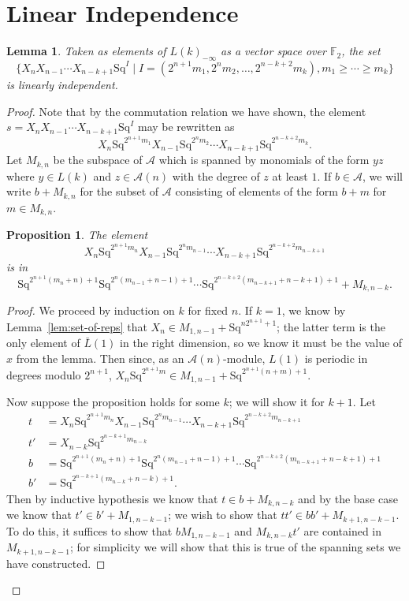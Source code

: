 \documentclass{article}
\newcommand{\A}{\mathcal{A}}
\newcommand{\F}{\mathbb{F}}
\newcommand{\Sq}{\mathrm{Sq}}
\renewcommand{\L}{\bar{L}}
\newcommand{\Lkm}[1][k]{L{(#1)}_{-\infty}}
\newtheorem{prop}{Proposition}
\newtheorem{lem}{Lemma}
\begin{document}
\section{Linear Independence}

\begin{lem}\label{lem:li-vs}
  Taken as elements of $\Lkm$ as a vector space over $\F_2$, the set
  \[\{X_nX_{n-1}\cdots X_{n-k+1}\Sq^I\mid I=(2^{n+1}m_1,2^nm_2,\ldots,2^{n-k+2}m_k), m_1\geq\cdots\geq m_k\}\]
  is linearly independent.
\end{lem}
\begin{proof}
  Note that by the commutation relation we have shown, the element $s=X_nX_{n-1}\cdots X_{n-k+1}\Sq^I$ may be rewritten as
  \[X_n\Sq^{2^{n+1}m_1}X_{n-1}\Sq^{2^nm_2}\cdots X_{n-k+1}\Sq^{2^{n-k+2}m_k}.\]
  Let $M_{k,n}$ be the subspace of $\A$ which is spanned by monomials of the form $yz$ where $y\in L(k)$ and $z\in \A(n)$ with the degree of $z$ at least $1$.  If $b\in \A$, we will write $b+M_{k,n}$ for the subset of $\A$ consisting of elements of the form $b+m$ for $m\in M_{k,n}$.

  \begin{prop}\label{prop:m-thing}
    The element
    \[X_n\Sq^{2^{n+1}m_n}X_{n-1}\Sq^{2^nm_{n-1}}\cdots X_{n-k+1}\Sq^{2^{n-k+2}m_{n-k+1}}\]
    is in
    \[\Sq^{2^{n+1}(m_n+n)+1}\Sq^{2^n(m_{n-1}+n-1)+1}\cdots\Sq^{2^{n-k+2}(m_{n-k+1}+n-k+1)+1} + M_{k,n-k}.\]
  \end{prop}
  \begin{proof}

    We proceed by induction on $k$ for fixed $n$.  If $k=1$, we know by Lemma~\ref{lem:set-of-reps} that $X_n\in M_{1,n-1}+\Sq^{n2^{n+1}+1}$; the latter term is the only element of $\L(1)$ in the right dimension, so we know it must be the value of $x$ from the lemma.  Then since, as an $\A(n)$-module, $L(1)$ is periodic in degrees modulo $2^{n+1}$, $X_n\Sq^{2^{n+1}m}\in M_{1,n-1}+\Sq^{2^{n+1}(n+m)+1}$.

  Now suppose the proposition holds for some $k$; we will show it for $k+1$.  Let 
  \begin{align*}
  t&=X_n\Sq^{2^{n+1}m_n}X_{n-1}\Sq^{2^nm_{n-1}}\cdots X_{n-k+1}\Sq^{2^{n-k+2}m_{n-k+1}} \\
  t'&=X_{n-k}\Sq^{2^{n-k+1}m_{n-k}} \\
  b&=\Sq^{2^{n+1}(m_n+n)+1}\Sq^{2^n(m_{n-1}+n-1)+1}\cdots\Sq^{2^{n-k+2}(m_{n-k+1}+n-k+1)+1} \\
  b'&=\Sq^{2^{n-k+1}(m_{n-k}+n-k)+1}.
  \end{align*}
  Then by inductive hypothesis we know that $t\in b+M_{k,n-k}$ and by the base case we know that $t'\in b'+M_{1,n-k-1}$; we wish to show that $tt'\in bb'+M_{k+1,n-k-1}$.  To do this, it suffices to show that $bM_{1,n-k-1}$ and $M_{k,n-k}t'$ are contained in $M_{k+1,n-k-1}$; for simplicity we will show that this is true of the spanning sets we have constructed.
  

\end{proof}
\end{proof}
\end{document}

